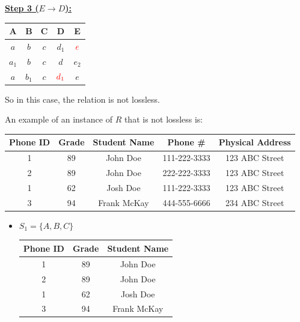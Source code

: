 \documentclass[12pt]{article}
\begin{document}
\begin{enumerate}[1.]
\begin{enumerate}[a)]
        \underline{\textbf{Step 3 ($E \to D$):}}

        \bigskip

        \begin{tabular}{|c|c|c|c|c|}
            \hline
            A & B & C & D & E\\
            \hline
            $a$ & $b$ & $c$ & $d_1$ & $\color{red}e$\\
            \hline
            $a_1$ & $b$ & $c$ & $d$ & $e_2$\\
            \hline
            $a$ & $b_1$ & $c$ & $\color{red}d_1$ & $e$\\
            \hline
        \end{tabular}

        \bigskip

        So in this case, the relation is not lossless.

        \bigskip

        An example of an instance of $R$ that is not lossless
        is:

        \bigskip

        \begin{tabular}{|c|c|c|c|c|}
            \hline
            Phone ID & Grade & Student Name & Phone \# & Physical Address\\
            \hline
            1 & 89 & John Doe & 111-222-3333 & 123 ABC Street\\
            \hline
            2 & 89 & John Doe & 222-222-3333 & 123 ABC Street\\
            \hline
            1 & 62 & Josh Doe & 111-222-3333 & 123 ABC Street\\
            \hline
            3 & 94 & Frank McKay & 444-555-6666 & 234 ABC Street\\
            \hline
        \end{tabular}

        \bigskip

        \begin{itemize}
            \item $S_1 = \{A,B,C\}$

            \bigskip

            \begin{tabular}{|c|c|c|}
                \hline
                Phone ID & Grade & Student Name\\
                \hline
                1 & 89 & John Doe\\
                \hline
                2 & 89 & John Doe\\
                \hline
                1 & 62 & Josh Doe\\
                \hline
                3 & 94 & Frank McKay\\
                \hline
            \end{tabular}


\end{itemize}
\end{enumerate}
\end{enumerate}
\end{document}
